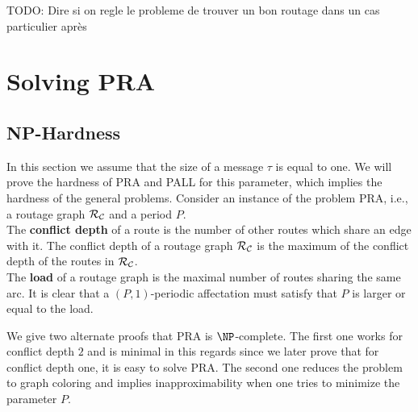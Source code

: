 \documentclass[a4paper,10pt]{article}
\newcommand{\todo}[1]{{\color{red} TODO: {#1}}}
\begin{document}
  
  \todo{Dire si on regle le probleme de trouver un bon routage dans un cas particulier après}
  
  
\section{Solving PRA}
  \label{sec:complexity}
  \subsection{NP-Hardness}

 In this section we assume that the size of a message $\tau$ is equal to one. 
 We will prove the hardness of PRA and PALL for this parameter, which implies the hardness of the general problems. 
Consider an instance of the problem PRA, i.e., a routage graph $\cal{R_{\cal C}}$ and a period $P$. \\
The {\bf conflict depth} of a route is the number of other routes which share an edge with it. 
The conflict depth of a routage graph  $\cal{R_{\cal C}}$ is the maximum of the conflict depth of the routes in $\cal{R_{\cal C}}$.\\
The {\bf load} of a routage graph is the maximal number of routes sharing the same arc.
It is clear that a $(P,1)$-periodic affectation must satisfy that $P$ is larger or equal to the load.


We give two alternate proofs that PRA is $\NP$-complete.
The first one works for conflict depth $2$ and is minimal in this regards since we later prove that for conflict depth one,
it is easy to solve PRA. The second one reduces the problem to graph coloring and implies inapproximability when one tries to minimize the parameter $P$. \\
\end{document}
